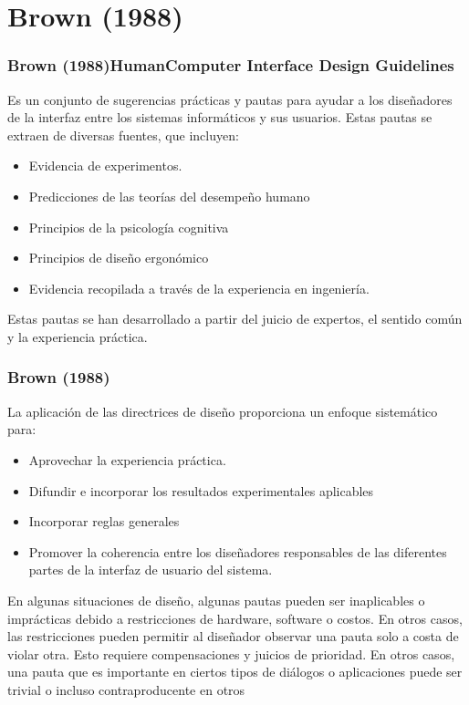 \documentclass[11pt]{beamer}
\begin{document}
\section{Brown (1988)}
\begin{frame}
\frametitle{Brown (1988)HumanComputer Interface Design Guidelines}
Es un conjunto de sugerencias prácticas y pautas para ayudar a los diseñadores de la interfaz entre los sistemas informáticos y sus usuarios. Estas pautas se extraen de diversas fuentes, que incluyen:

\begin{itemize}
\item Evidencia de experimentos.
\item Predicciones de las teorías del desempeño humano
\item Principios de la psicología cognitiva
\item Principios de diseño ergonómico
\item Evidencia recopilada a través de la experiencia en ingeniería.
\end{itemize}
Estas pautas se han desarrollado a partir del juicio de expertos, el sentido común y la experiencia práctica.
\end{frame}
\begin{frame}
\frametitle{Brown (1988)}
La aplicación de las directrices de diseño proporciona un enfoque sistemático para:

\begin{itemize}
\item Aprovechar la experiencia práctica.
\item Difundir e incorporar los resultados experimentales aplicables
\item Incorporar reglas generales 
\item Promover la coherencia entre los diseñadores responsables de las diferentes partes de la interfaz de usuario del sistema.

\end{itemize}
En algunas situaciones de diseño, algunas pautas pueden ser inaplicables o imprácticas debido a restricciones de hardware, software o costos. En otros casos, las restricciones pueden permitir al diseñador observar una pauta solo a costa de violar otra. Esto requiere compensaciones y juicios de prioridad. En otros casos, una pauta que es importante en ciertos tipos de diálogos o aplicaciones puede ser trivial o incluso contraproducente en otros 
\end{frame}
\end{document}
